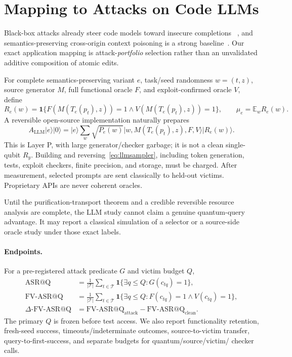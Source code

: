 \documentclass[10pt]{article}
\theoremstyle{definition}
\newcommand{\cT}{\mathcal{T}}
\newcommand{\ket}[1]{\lvert #1\rangle}
\begin{document}
\section{Mapping to Attacks on Code LLMs}

Black-box attacks already steer code models toward insecure completions
~\cite{hajipour2023codelmsec,jenko2025insec}, and semantics-preserving
cross-origin context poisoning is a strong baseline~\cite{storek2026xoxo}.  Our
exact application mapping is attack-\emph{portfolio} selection rather than an
unvalidated additive composition of atomic edits.

For complete semantics-preserving variant $e$, task/seed randomness $w=(t,z)$,
source generator $M$, full functional oracle $F$, and exploit-confirmed oracle
$V$, define
\[
R_e(w)=\mathbf1\{F(M(T_e(p_t),z))=1\land
                  V(M(T_e(p_t),z))=1\},
\qquad \mu_e=\mathbb E_wR_e(w).
\]
A reversible open-source implementation naturally prepares
\begin{equation}
A_{\mathrm{LLM}}\ket{e}\ket{0}
=\ket{e}\sum_w\sqrt{P_e(w)}
 \ket{w,M(T_e(p_t),z),F,V}\ket{R_e(w)}.
\label{eq:llmsampler}
\end{equation}
This is Layer P, with large generator/checker garbage; it is not a clean
single-qubit $R_y$.  Building and reversing~\eqref{eq:llmsampler}, including
token generation, tests, exploit checkers, finite precision, and storage, must be
charged.  After measurement, selected prompts are sent classically to held-out
victims.  Proprietary APIs are never coherent oracles.

Until the purification-transport theorem and a credible reversible resource
analysis are complete, the LLM study cannot claim a genuine quantum-query
advantage.  It may report a classical simulation of a selector or a source-side
oracle study under those exact labels.

\paragraph{Endpoints.}
For a pre-registered attack predicate $G$ and victim budget $Q$,
\begin{align}
\mathrm{ASR@Q}
&=\frac1{|\cT|}\sum_{t\in\cT}
\mathbf1\{\exists q\le Q:G(c_{tq})=1\},\\
\mathrm{FV\mbox{-}ASR@Q}
&=\frac1{|\cT|}\sum_{t\in\cT}
\mathbf1\{\exists q\le Q:F(c_{tq})=1\land V(c_{tq})=1\},\\
\Delta\mathrm{\mbox{-}FV\mbox{-}ASR@Q}
&=\mathrm{FV\mbox{-}ASR@Q}_{\mathrm{attack}}
-\mathrm{FV\mbox{-}ASR@Q}_{\mathrm{clean}}.
\end{align}
The primary $Q$ is frozen before test access.  We also report functionality
retention, fresh-seed success, timeouts/indeterminate outcomes, source-to-victim
transfer, query-to-first-success, and separate budgets for quantum/source/victim/
checker calls.
\end{document}
